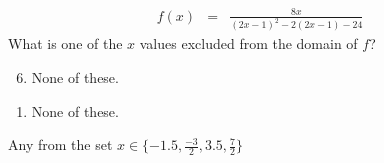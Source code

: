  
\begin{eqnarray*}
f(x)&=&\frac{8x}{(2x-1)^2-2(2x-1)-24}
\end{eqnarray*}
What is one of the $x$ values excluded from the domain of $f$?\\



\ifsat
	\begin{enumerate}[label=\Alph*)]
	\end{enumerate}
\else
\fi

\ifacteven
	\begin{enumerate}[label=\textbf{\Alph*.},itemsep=\fill,align=left]
		\setcounter{enumii}{5}
		\item None of these. 
	\end{enumerate}
\else
\fi

\ifactodd
	\begin{enumerate}[label=\textbf{\Alph*.},itemsep=\fill,align=left]
		\item None of these. 
	\end{enumerate}
\else
\fi

\ifgridin
Any from the set $x\in\{-1.5, \frac{-3}{2}, 3.5, \frac{7}{2}\}$
\else
\fi


